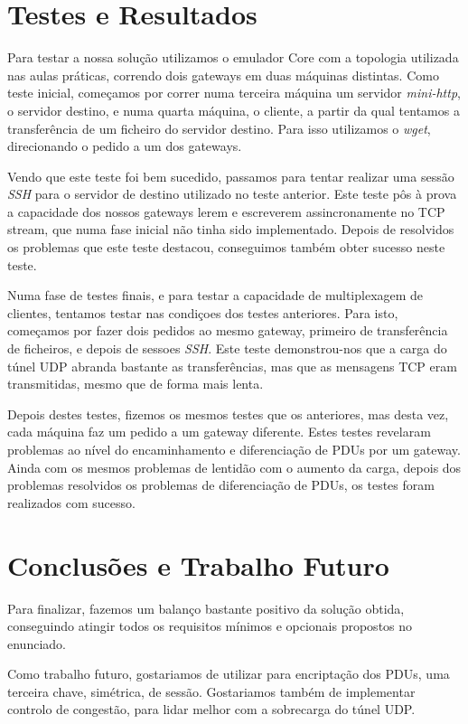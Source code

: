 \documentclass[a4paper]{report}
\begin{document}
\chapter{Testes e Resultados}

Para testar a nossa solução utilizamos o emulador Core com a topologia utilizada
nas aulas práticas, correndo dois gateways em duas máquinas distintas. Como
teste inicial, começamos por correr numa terceira máquina um servidor 
\textit{mini-http}, o servidor destino, e numa quarta máquina, o cliente,
a partir da qual tentamos a transferência de um ficheiro do servidor destino.
Para isso utilizamos o \textit{wget}, direcionando o pedido a um dos gateways.

Vendo que este teste foi bem sucedido, passamos para tentar realizar uma
sessão \textit{SSH} para o servidor de destino utilizado no teste anterior.
Este teste pôs à prova a capacidade dos nossos gateways lerem e escreverem
assincronamente no TCP stream, que numa fase inicial não tinha sido
implementado. Depois de resolvidos os problemas que este teste destacou,
conseguimos também obter sucesso neste teste.

Numa fase de testes finais, e para testar a capacidade de multiplexagem de
clientes, tentamos testar nas condiçoes dos testes anteriores. Para isto,
começamos por fazer dois pedidos ao mesmo gateway, primeiro de transferência de
ficheiros, e depois de sessoes \textit{SSH}. Este teste demonstrou-nos que
a carga do túnel UDP abranda bastante as transferências, mas que as mensagens
TCP eram transmitidas, mesmo que de forma mais lenta. 

Depois destes testes, fizemos os mesmos testes que os anteriores, mas desta
vez, cada máquina faz um pedido a um gateway diferente. Estes testes revelaram
problemas ao nível do encaminhamento e diferenciação de PDUs por um gateway.
Ainda com os mesmos problemas de lentidão com o aumento da carga, depois
dos problemas resolvidos os problemas de diferenciação de PDUs, os testes
foram realizados com sucesso.

\chapter{Conclusões e Trabalho Futuro}

Para finalizar, fazemos um balanço bastante positivo da solução obtida,
conseguindo atingir todos os requisitos mínimos e opcionais propostos no
enunciado.

Como trabalho futuro, gostariamos de utilizar para encriptação dos PDUs,
uma terceira chave, simétrica, de sessão. Gostariamos também de implementar
controlo de congestão, para lidar melhor com a sobrecarga do túnel UDP. 
\end{document}
